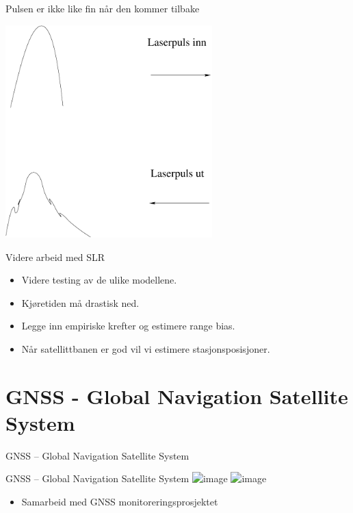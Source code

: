 \documentclass[12pt,table,t]{beamer}
\begin{document}
\begin{frame}{Pulsen er ikke like fin når den kommer tilbake}
  \begin{center}
    \includegraphics[width=0.6\textwidth]{figure/pulse}
  \end{center}
\end{frame}


\begin{frame}{Videre arbeid med SLR}

  \begin{itemize}
  \item Videre testing av de ulike modellene.
  \item Kjøretiden må drastisk ned.
  \item Legge inn empiriske krefter og estimere range bias.
  \item Når satellittbanen er god vil vi estimere stasjonsposisjoner.
  \end{itemize}
\end{frame}


\section{GNSS - Global Navigation Satellite System}

\begin{frame}[c]{}
  \begin{center}
    {\Huge GNSS -- Global Navigation Satellite System}
  \end{center}
\end{frame}


\begin{frame}{GNSS -- Global Navigation Satellite System}
  \includegraphics<1>[width=\textwidth]{figure/multi_gnss_overview}
  \includegraphics<2>[width=\textwidth]{figure/multi_gnss_selection}

  \vfill

  \begin{itemize}
  \item<2> Samarbeid med GNSS monitoreringsprosjektet
  \end{itemize}
\end{frame}
\end{document}
